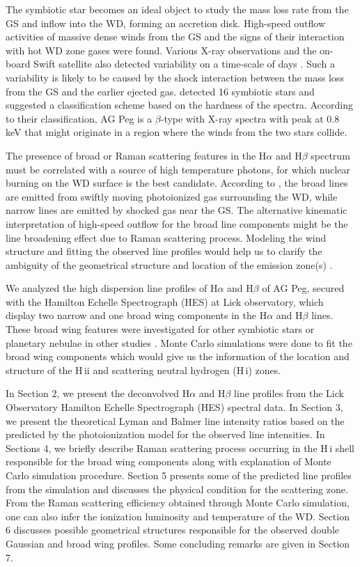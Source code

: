 \documentclass[a4paper,fleqn,usenatbib,useAMS]{mnras}
\def\ha{H{$\alpha$}}
\def\hb{H{$\beta$}}
\def\hi{H\,{\sc i}}
\def\hii{H\,{\sc ii}}
\begin{document}
The symbiotic star becomes an ideal object to study the mass loss rate from the GS and inflow into the WD, forming an accretion disk. High-speed outflow activities of massive dense winds from the GS and the signs of their interaction with hot WD zone gases were found. Various X-ray observations and the on-board Swift satellite also detected variability on a time-scale of days
\citep{all81, mur95, mur97, lun13, zhe16}.
Such a variability is likely to be caused by the shock interaction between the mass loss from the GS and the earlier ejected gas. \citet{mur97} detected 16 symbiotic stars and suggested a classification scheme based on the hardness of the spectra. According to their classification, AG Peg is a $\beta$-type with X-ray spectra with peak at 0.8 keV that might originate in a region where the winds from the two stars collide.

The presence of broad or Raman scattering features in the {\ha} and {\hb} spectrum
must be correlated with a source of high temperature photons, for which nuclear burning on the WD surface is the best candidate. According to \citet{con97}, the broad lines are emitted from swiftly moving photoionized gas surrounding the WD,
while narrow lines are emitted by shocked gas near the GS. The alternative kinematic interpretation of high-speed outflow for the broad line components
might be the line broadening effect due to Raman scattering process.
Modeling the wind structure and fitting the observed line profiles
would help us to clarify the ambiguity of the geometrical structure
and location of the emission zone(s) \citep{mer51, mer59, bel85, ken87, fek00, kim08, mun13}.

We analyzed the high dispersion line profiles of {\ha} and {\hb} of AG Peg, secured with the Hamilton Echelle Spectrograph (HES) at Lick observatory, which display two narrow and one broad wing components in the {\ha} and {\hb} lines. These broad wing features were investigated for other symbiotic stars or planetary nebulae in other studies \citep{lee00}. Monte Carlo simulations were done to fit the broad wing components which would give us the information of the location and structure of the {\hii} and scattering neutral hydrogen ({\hi}) zones.

In Section 2, we present the deconvolved {\ha} and {\hb} line profiles from the Lick Observatory Hamilton Echelle Spectrograph (HES) spectral data. In Section 3, we present the theoretical Lyman and Balmer line intensity ratios based on the predicted by the photoionization model for the observed line intensities. In Sections 4, we briefly describe Raman scattering process occurring in the {\hi} shell  responsible for the broad wing components along with explanation of Monte Carlo simulation procedure. Section 5 presents some of the predicted line profiles from the simulation and discusses the physical condition for the scattering zone. From the Raman scattering efficiency obtained through Monte Carlo simulation, one can also infer the ionization luminosity and temperature of the WD. Section 6 discusses possible geometrical structures responsible for the observed double Gaussian and broad wing profiles.
Some concluding remarks are given in Section 7.
\end{document}
